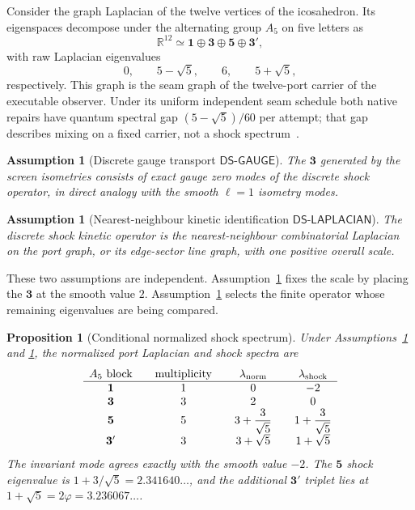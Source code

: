 \documentclass[11pt]{article}
\newtheorem{proposition}[theorem]{Proposition}
\newtheorem{assumption}[theorem]{Assumption}
\theoremstyle{remark}
\newcommand{\R}{\mathbb R}
\begin{document}
Consider the graph Laplacian of the twelve vertices of the icosahedron. Its
eigenspaces decompose under the alternating group \(A_5\) on five letters as
\[
\R^{12}\simeq\mathbf1\oplus\mathbf3\oplus\mathbf5\oplus\mathbf3',
\]
with raw Laplacian eigenvalues
\[
0,\qquad 5-\sqrt5,\qquad 6,\qquad 5+\sqrt5,
\]
respectively. This graph is the seam graph of the twelve-port carrier of the
executable observer. Under its uniform independent seam schedule both native
repairs have quantum spectral gap \((5-\sqrt5)/60\) per attempt; that gap
describes mixing on a fixed carrier, not a shock spectrum~\cite{ophmixing}.

\begin{assumption}[Discrete gauge transport
\(\mathsf{DS\text{-}GAUGE}\)]
\label{ass:dsgauge}
The \(\mathbf3\) generated by the screen isometries consists of exact gauge
zero modes of the discrete shock operator, in direct analogy with the smooth
\(\ell=1\) isometry modes.
\end{assumption}

\begin{assumption}[Nearest-neighbour kinetic identification
\(\mathsf{DS\text{-}LAPLACIAN}\)]
\label{ass:dslaplacian}
The discrete shock kinetic operator is the nearest-neighbour combinatorial
Laplacian on the port graph, or its edge-sector line graph, with one positive
overall scale.
\end{assumption}

These two assumptions are independent. Assumption~\ref{ass:dsgauge} fixes the
scale by placing the \(\mathbf3\) at the smooth value \(2\).
Assumption~\ref{ass:dslaplacian} selects the finite operator whose remaining
eigenvalues are being compared.

\begin{proposition}[Conditional normalized shock spectrum]
\label{prop:spectrum}
Under Assumptions~\ref{ass:dsgauge} and \ref{ass:dslaplacian}, the normalized
port Laplacian and shock spectra are
\[
\begin{array}{c@{\qquad}c@{\qquad}c@{\qquad}c}
A_5\text{ block} & \text{multiplicity} &
\lambda_{\mathrm{norm}} & \lambda_{\mathrm{shock}}\\
\hline
\mathbf1 & 1 & 0 & -2\\
\mathbf3 & 3 & 2 & 0\\
\mathbf5 & 5 & 3+\dfrac3{\sqrt5} & 1+\dfrac3{\sqrt5}\\[3pt]
\mathbf3' & 3 & 3+\sqrt5 & 1+\sqrt5
\end{array}
\]
The invariant mode agrees exactly with the smooth value \(-2\). The
\(\mathbf5\) shock eigenvalue is \(1+3/\sqrt5=2.341640\ldots\), and the
additional \(\mathbf3'\) triplet lies at
\(1+\sqrt5=2\varphi=3.236067\ldots\).
\end{proposition}
\end{document}
